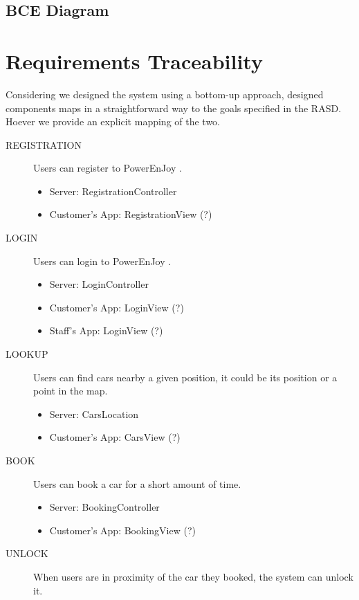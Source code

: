 \documentclass[11pt]{article} %
\newcommand{\pe}{PowerEnJoy }
\begin{document}
\subsection{BCE Diagram}
	

\newpage
\section{Requirements Traceability}

Considering we designed the system using a bottom-up approach, designed components maps in a straightforward way to the goals specified in the RASD. Hoever we provide an explicit mapping of the two.

 \begin{description}
 	\item[REGISTRATION] Users can register to \pe.
	\begin{itemize}
		\item Server: RegistrationController
		\item Customer's App: RegistrationView (?)
	\end{itemize}

	\item[LOGIN] Users can login to \pe.
	\begin{itemize}
		\item Server: LoginController
		\item Customer's App: LoginView (?)
		\item Staff's App: LoginView (?)
	\end{itemize}

 	\item[LOOKUP] Users can find cars nearby a given position, it could be its position or a point in the map.
	\begin{itemize}
		\item Server: CarsLocation
		\item Customer's App: CarsView (?)
	\end{itemize}

 	\item[BOOK] Users can book a car for a short amount of time.
	\begin{itemize}
		\item Server: BookingController
		\item Customer's App: BookingView (?)
	\end{itemize}

 	\item[UNLOCK] When users are in proximity of the car they booked, the system can unlock it.


\end{description}
\end{document}
